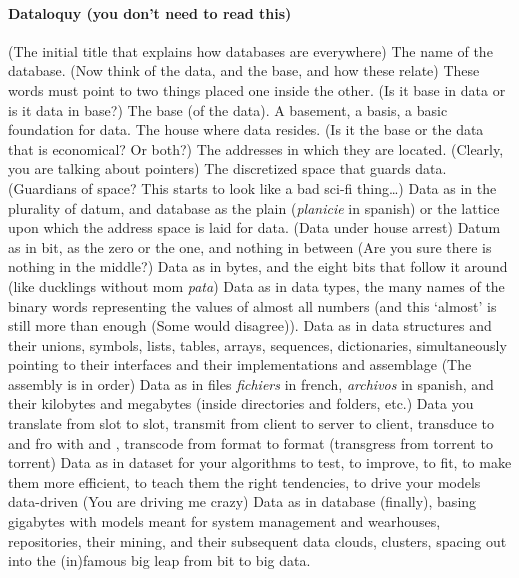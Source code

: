 




\paragraph{Dataloquy (you don't need to read this)}
(The initial title that explains how databases are everywhere) The name of the database. (Now think of the data, and the base, and how these relate) These words must point to two things placed one inside the other. (Is it base in data or is it data in base?) The base (of the data). A basement, a basis, a basic foundation for data. The house where data resides. (Is it the base or the data that is economical? Or both?) The addresses in which they are located. (Clearly, you are talking about pointers) The discretized space that guards data. (Guardians of space? This starts to look like a bad sci-fi thing\dots) Data as in the plurality of datum, and database as the plain (\textit{planicie} in spanish) or the lattice upon which the address space is laid for data. (Data under house arrest) Datum as in bit, as the zero or the one, and nothing in between (Are you sure there is nothing in the middle?) Data as in bytes, and the eight bits that follow it around (like ducklings without mom \textit{pata}) Data as in data types, the many names of the binary words representing the values of almost all numbers (and this `almost' is still more than enough (Some would disagree)). Data as in data structures and their unions, symbols, lists, tables, arrays, sequences, dictionaries, simultaneously pointing to their interfaces and their implementations and assemblage (The assembly is in order) Data as in files \textit{fichiers} in french, \textit{archivos} in spanish, and their kilobytes and megabytes (inside directories and folders, etc.) Data you translate from slot to slot, transmit from client to server to client, transduce to and fro with  and , transcode from format to format (transgress from torrent to torrent) Data as in dataset for your algorithms to test, to improve, to fit, to make them more efficient, to teach them the right tendencies, to drive your models data-driven (You are driving me crazy) Data as in database (finally), basing gigabytes with models meant for system management and wearhouses, repositories, their mining, and their subsequent data clouds, clusters, spacing out into the (in)famous big leap from bit to big data.









